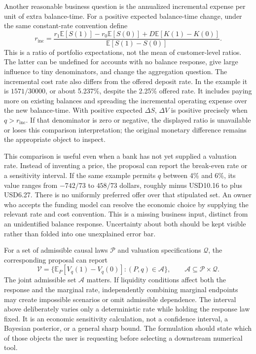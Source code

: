 Another reasonable business question is the annualized incremental expense
per unit of extra balance-time. For a positive expected balance-time change,
under the same constant-rate convention define
\begin{equation}
 r_{\mathrm{inc}}=
 \frac{r_1\mathbb E[S(1)]-r_0\mathbb E[S(0)]
       +D\mathbb E[K(1)-K(0)]}
      {\mathbb E[S(1)-S(0)]}.
 \label{exec17:l2-marginal}
\end{equation}
This is a ratio of portfolio expectations, not the mean of customer-level
ratios. The latter can be undefined for accounts with no balance response,
give large influence to tiny denominators, and change the aggregation
question. The incremental cost rate also differs from the offered deposit
rate. In the example it is $1571/30000$, or about 5.237\%, despite the
2.25\% offered rate. It includes paying more on existing balances and
spreading the incremental operating expense over the new balance-time.
With positive expected $\Delta S$, $\Delta V$ is positive precisely when
$q>r_{\mathrm{inc}}$. If that denominator is zero or negative, the displayed
ratio is unavailable or loses this comparison interpretation; the original
monetary difference remains the appropriate object to inspect.

This comparison is useful even when a bank has not yet supplied a valuation
rate. Instead of inventing a price, the proposal can report the break-even
rate or a sensitivity interval. If the same example permits $q$ between
4\% and 6\%, its value ranges from $-742/73$ to $458/73$ dollars, roughly
minus USD10.16 to plus USD6.27. There is no uniformly preferred offer over
that stipulated set. An owner who accepts the funding model can resolve
the economic choice by supplying the relevant rate and cost convention.
This is a missing business input, distinct from an unidentified balance
response. Uncertainty about both should be kept visible rather than folded
into one unexplained error bar.

For a set of admissible causal laws $\mathcal P$ and valuation specifications
$\mathcal Q$, the corresponding proposal can report
\begin{equation}
 \mathcal V=\{\mathbb E_P[V_q(1)-V_q(0)]:(P,q)\in\mathcal A\},
 \qquad \mathcal A\subseteq\mathcal P\times\mathcal Q.
 \label{exec17:l2-joint}
\end{equation}
The joint admissible set $\mathcal A$ matters. If liquidity conditions affect
both the response and the marginal rate, independently combining marginal
endpoints may create impossible scenarios or omit admissible dependence.
The interval above deliberately varies only a deterministic rate while
holding the response law fixed. It is an economic sensitivity calculation,
not a confidence interval, a Bayesian posterior, or a general sharp bound.
The formulation should state which of those objects the user is requesting
before selecting a downstream numerical tool.

